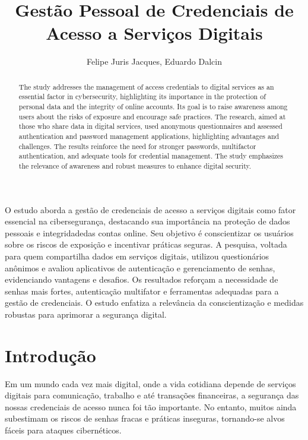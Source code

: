 \documentclass[12pt]{article}
\title{Gestão Pessoal de Credenciais de Acesso a Serviços Digitais}
\author{Felipe Juris Jacques\inst{1}, Eduardo Dalcin\inst{1} }
\begin{document}
 

\maketitle

\begin{abstract}
  The study addresses the management of access credentials to digital services as an
  essential factor in cybersecurity, highlighting its importance in the protection of
  personal data and the integrity of online accounts.
  Its goal is to raise awareness among users about the risks of exposure and encourage
  safe practices.
  The research, aimed at those who share data in digital services, used anonymous
  questionnaires and assessed authentication and password management applications,
  highlighting advantages and challenges.
  The results reinforce the need for stronger passwords, multifactor authentication, and
  adequate tools for credential management.
  The study emphasizes the relevance of awareness and robust measures to enhance digital
  security.
\end{abstract}
     
\begin{resumo}
  O estudo aborda a gestão de credenciais de acesso a serviços digitais como fator
  essencial na cibersegurança, destacando sua importância na proteção de dados pessoais
  e integridadedas contas online.
  Seu objetivo é conscientizar os usuários sobre os riscos de exposição e incentivar
  práticas seguras.
  A pesquisa, voltada para quem compartilha dados em serviços digitais, utilizou
  questionários anônimos e avaliou aplicativos de autenticação e gerenciamento de
  senhas, evidenciando vantagens e desafios.
  Os resultados reforçam a necessidade de senhas mais fortes, autenticação multifator
  e ferramentas adequadas para a gestão de credenciais.
  O estudo enfatiza a relevância da conscientização e medidas robustas para aprimorar
  a segurança digital.
\end{resumo}

\section{Introdução}

Em um mundo cada vez mais digital, onde a vida cotidiana depende de serviços digitais
para comunicação, trabalho e até transações financeiras, a segurança das nossas
credenciais de acesso nunca foi tão importante.
No entanto, muitos ainda subestimam os riscos de senhas fracas e práticas inseguras,
tornando-se alvos fáceis para ataques cibernéticos.
\end{document}

